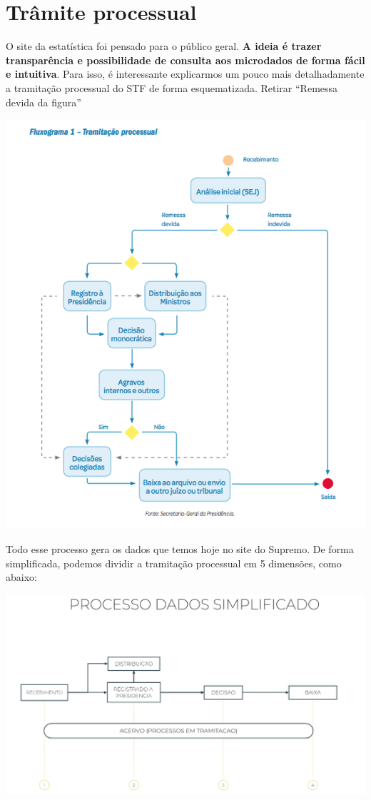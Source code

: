 \documentclass[
]{book}
\theoremstyle{definition}
\theoremstyle{definition}
\theoremstyle{definition}
\theoremstyle{definition}
\theoremstyle{remark}
\begin{document}
\hypertarget{tramite}{%
\chapter{Trâmite processual}\label{tramite}}

O site da estatística foi pensado para o público geral. \textbf{A ideia é trazer transparência e possibilidade de consulta aos microdados de forma fácil e intuitiva}. Para isso, é interessante explicarmos um pouco mais detalhadamente a tramitação processual do STF de forma esquematizada. Retirar ``Remessa devida da figura''

\includegraphics[width=1\linewidth]{imagens/fig-cap3-1}

Todo esse processo gera os dados que temos hoje no site do Supremo. De forma simplificada, podemos dividir a tramitação processual em 5 dimensões, como abaixo:

\includegraphics[width=1\linewidth]{imagens/fig-cap3-2}
\end{document}
